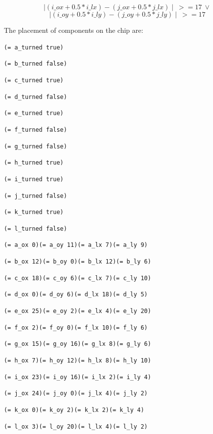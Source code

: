 \documentclass[a4paper]{article}
\begin{document}
	$$\mid(i\_ox + 0.5 * i\_lx) - (j\_ox + 0.5 * j\_lx)\mid\ >= 17\ \vee$$
	$$\mid(i\_oy + 0.5 * i\_ly) - (j\_oy + 0.5 * j\_ly)\mid\ >= 17 $$
	
	The placement of components on the chip are:
	
	{\tt (= a\_turned true)}
	
	{\tt (= b\_turned false)}
	
	{\tt (= c\_turned true)}
	
	{\tt (= d\_turned false)}
	
	{\tt (= e\_turned true)}
	
	{\tt (= f\_turned false)}
	
	{\tt (= g\_turned false)}
	
	{\tt (= h\_turned true)}
	
	{\tt (= i\_turned true)}
	
	{\tt (= j\_turned false)}
	
	{\tt (= k\_turned true)}
	
	{\tt (= l\_turned false)}
	
	{\tt (= a\_ox 0)(= a\_oy 11)(= a\_lx 7)(= a\_ly 9)}
	
	{\tt (= b\_ox 12)(= b\_oy 0)(= b\_lx 12)(= b\_ly 6)}
	
	{\tt (= c\_ox 18)(= c\_oy 6)(= c\_lx 7)(= c\_ly 10)}
	
	{\tt (= d\_ox 0)(= d\_oy 6)(= d\_lx 18)(= d\_ly 5)}
	
	{\tt (= e\_ox 25)(= e\_oy 2)(= e\_lx 4)(= e\_ly 20)}
	
	{\tt (= f\_ox 2)(= f\_oy 0)(= f\_lx 10)(= f\_ly 6)}
	
	{\tt (= g\_ox 15)(= g\_oy 16)(= g\_lx 8)(= g\_ly 6)}
	
	{\tt (= h\_ox 7)(= h\_oy 12)(= h\_lx 8)(= h\_ly 10)}
	
	{\tt (= i\_ox 23)(= i\_oy 16)(= i\_lx 2)(= i\_ly 4)}
	
	{\tt (= j\_ox 24)(= j\_oy 0)(= j\_lx 4)(= j\_ly 2)}
	
	{\tt (= k\_ox 0)(= k\_oy 2)(= k\_lx 2)(= k\_ly 4)}
	
	{\tt (= l\_ox 3)(= l\_oy 20)(= l\_lx 4)(= l\_ly 2)}\\
	
\end{document}

